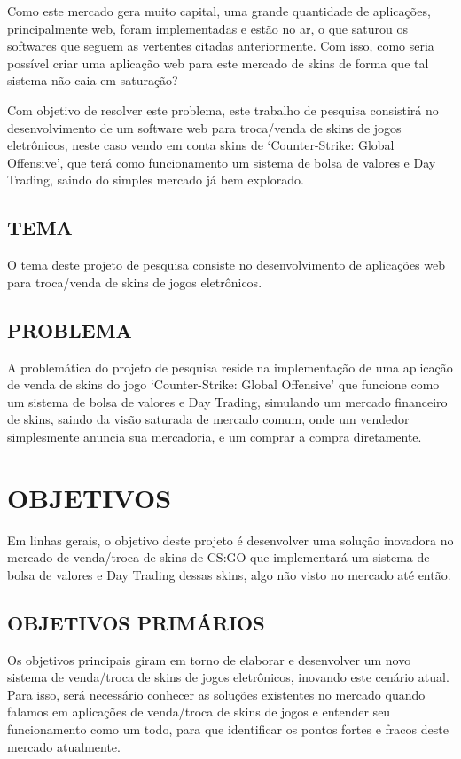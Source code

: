 \documentclass[a4paper, 12pt]{article}
\begin{document}
    Como este mercado gera muito capital, uma grande quantidade de aplicações, principalmente web, foram implementadas e estão no ar, o que saturou os softwares que seguem as vertentes citadas anteriormente. Com isso, como seria possível criar uma aplicação web para este mercado de skins de forma que tal sistema não caia em saturação?
    
    Com objetivo de resolver este problema, este trabalho de pesquisa consistirá no desenvolvimento de um software web para troca/venda de skins de jogos eletrônicos, neste caso vendo em conta skins de ‘Counter-Strike: Global Offensive’, que terá como funcionamento um sistema de bolsa de valores e Day Trading, saindo do simples mercado já bem explorado.

    \subsection{TEMA}
    O tema deste projeto de pesquisa consiste no desenvolvimento de aplicações web para troca/venda de skins de jogos eletrônicos.
    
    \subsection{PROBLEMA}
    A problemática do projeto de pesquisa reside na implementação de uma aplicação de venda de skins do jogo ‘Counter-Strike: Global Offensive’ que funcione como um sistema de bolsa de valores e Day Trading, simulando um mercado financeiro de skins, saindo da visão saturada de mercado comum, onde um vendedor simplesmente anuncia sua mercadoria, e um comprar a compra diretamente.

    \section{OBJETIVOS}
    Em linhas gerais, o objetivo deste projeto é desenvolver uma solução inovadora no mercado de venda/troca de skins de CS:GO que implementará um sistema de bolsa de valores e Day Trading dessas skins, algo não visto no mercado até então.

    \subsection{OBJETIVOS PRIMÁRIOS}
    Os objetivos principais giram em torno de elaborar e desenvolver um novo sistema de venda/troca de skins de jogos eletrônicos, inovando este cenário atual. Para isso, será necessário conhecer as soluções existentes no mercado quando falamos em aplicações de venda/troca de skins de jogos e entender seu funcionamento como um todo, para que identificar os pontos fortes e fracos deste mercado atualmente.
    
\end{document}
